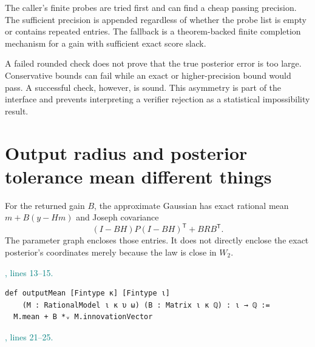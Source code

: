 \documentclass[11pt]{article}\usepackage{needspace}\renewcommand{\paperkind}{Lean companion}\setlength{\parskip}{0.35em}
\begin{document}
The caller's finite probes are tried first and can find a cheap passing precision. The sufficient precision is appended regardless of whether the probe list is empty or contains repeated entries. The fallback is a theorem-backed finite completion mechanism for a gain with sufficient exact score slack.

A failed rounded check does not prove that the true posterior error is too large. Conservative bounds can fail while an exact or higher-precision bound would pass. A successful check, however, is sound. This asymmetry is part of the interface and prevents interpreting a verifier rejection as a statistical impossibility result.

\section{Output radius and posterior tolerance mean different things}

For the returned gain $B$, the approximate Gaussian has exact rational mean $m+B(y-Hm)$ and Joseph covariance
\[
 (I-BH)P(I-BH)^{\mathsf T}+BRB^{\mathsf T}.
\]
The parameter graph encloses those entries. It does not directly enclose the exact posterior's coordinates merely because the law is close in $W_2$.



{\small\textcolor{teal}{, lines 13--15.}\par}

\begin{lstlisting}[style=BayesSource]
def outputMean [Fintype κ] [Fintype ι]
    (M : RationalModel ι κ υ ω) (B : Matrix ι κ ℚ) : ι → ℚ :=
  M.mean + B *ᵥ M.innovationVector
\end{lstlisting}



{\small\textcolor{teal}{, lines 21--25.}\par}
\end{document}
